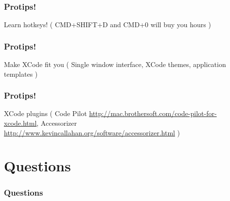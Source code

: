 \documentclass[10pt]{beamer}
\begin{document}
    
\begin{frame}[fragile]
  \frametitle{Protips!}
  Learn hotkeys! ( CMD+SHIFT+D  and CMD+0 will buy you hours )

\end{frame}

\begin{frame}[fragile]
  \frametitle{Protips!}
  Make XCode fit you ( Single window interface, XCode themes, application templates )

\end{frame}

\begin{frame}[fragile]
  \frametitle{Protips!}
  XCode plugins ( Code Pilot \url{http://mac.brothersoft.com/code-pilot-for-xcode.html}, Accessorizer \url{http://www.kevincallahan.org/software/accessorizer.html} )

\end{frame}

    

   
  

  
\section{Questions}
\begin{frame}[fragile]
  \frametitle{Questions}
  
\end{frame}


  


{}

\end{document}
